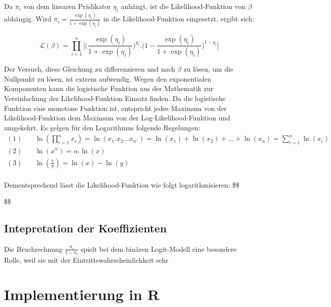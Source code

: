 \documentclass[12pt,]{article}
\begin{document}
Da \(\pi_i\) von dem linearen Prädikator \(\eta_i\) anhängt, ist die
Likelihood-Funktion von \(\beta\) abhängig. Wird
\(\pi_i = \frac{\exp(\eta_i)}{1 + \exp(\eta_i)}\) in die
Likelihood-Funktion eingesetzt, ergibt sich:

\[
\mathcal{L}(\beta) = {\prod_{i=1}^{n} \Bigg[ \Big( \frac{\exp(\eta_i)}{1 + \exp(\eta_i)} \Big)^{y_i}.\Big(1-\frac{\exp(\eta_i)}{1 + \exp(\eta_i)}\Big)^{1-y_i}}\Bigg]
\]

Der Versuch, diese Gleichung zu differenzieren und nach \(\beta\) zu
lösen, um die Nullpunkt zu lösen, ist extrem aufwendig. Wegen den
exponentialen Komponenten kann die logistische Funktion aus der
Mathematik zur Vereinfachung der Likelihood-Funktion Einsatz finden. Da
die logistische Funktion eine monotone Funktion ist, entspricht jedes
Maximum von der Likelihood-Funktion dem Maximum von der
Log-Likelihood-Funktion und umgekehrt. Es gelgen für den Logarithmus
folgende Regelungen: \[
\begin{aligned}
(1) \quad &\ln(\prod_{i=1}^{n}x_i) = \ln(x_1.x_2...x_n.) = \ln(x_1) + \ln(x_2) + ... + \ln(x_n) = \sum_{i=1}^{n} \ln(x_i) \\
(2) \quad &\ln(x^\alpha) = \alpha.\ln(x) \\
(3) \quad &\ln(\frac{x}{y}) = \ln(x) - \ln(y) \\
\end{aligned}
\]

Dementsprechend lässt die Likelihood-Funktion wie folgt
logarithmisieren: \$\$

\$\$

\subsection{Intepretation der
Koeffizienten}\label{intepretation-der-koeffizienten}

Die Bruchrechnung \(\frac{\pi_i}{1-\pi_i}\) spielt bei dem binären
Logit-Modell eine besondere Rolle, weil sie mit der
Eintrittswahrscheinlichkeit sehr

\section{Implementierung in R}\label{implementierung-in-r}
\end{document}
